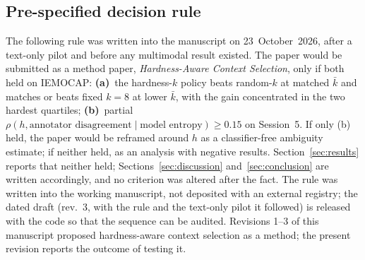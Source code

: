 \documentclass[journal]{IEEEtran}
\newcommand{\kbar}{\bar{k}}
\begin{document}
\subsection{Pre-specified decision rule}\label{sec:rule}
The following rule was written into the manuscript on 23~October~2026, after a text-only pilot and before any multimodal result existed. The paper would be submitted as a method paper, \emph{Hardness-Aware Context Selection}, only if both held on IEMOCAP: \textbf{(a)}~the hardness-$k$ policy beats random-$k$ at matched $\kbar$ and matches or beats fixed $k = 8$ at lower $\kbar$, with the gain concentrated in the two hardest quartiles; \textbf{(b)}~partial $\rho(h, \text{annotator disagreement} \mid \text{model entropy}) \geq 0.15$ on Session~5. If only (b) held, the paper would be reframed around $h$ as a classifier-free ambiguity estimate; if neither held, as an analysis with negative results. Section~\ref{sec:results} reports that neither held; Sections~\ref{sec:discussion} and~\ref{sec:conclusion} are written accordingly, and no criterion was altered after the fact. The rule was written into the working manuscript, not deposited with an external registry; the dated draft (rev.~3, with the rule and the text-only pilot it followed) is released with the code so that the sequence can be audited. Revisions 1--3 of this manuscript proposed hardness-aware context selection as a method; the present revision reports the outcome of testing it.
\end{document}
